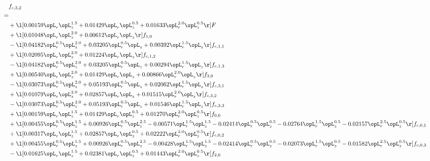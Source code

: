 \begin{alignat}{2} 
\label{eq:f_32_1} 
& f_{c,3,2} \nonumber \\ 
 = \\ 
& + \l[  0.00159 \opL_r \opL_z^{1.5} +  0.01429 \opL_r \opL_z^{0.5} +  0.01633 \opL_r^{2.0} \opL_z^{0.5}  \r] F \nonumber \\ 
& + \l[  0.01048 \opL_r \opL_z^{2.0} +  0.00612 \opL_r \opL_z  \r] f_{1,0} \nonumber \\ 
& - \l[  0.04182 \opL_r^{0.5} \opL_z^{2.0} +  0.03205 \opL_r^{0.5} \opL_z +  0.00392 \opL_r^{1.5} \opL_z  \r] f_{c,1,1} \nonumber \\ 
& + \l[  0.02095 \opL_r \opL_z^{2.0} +  0.01224 \opL_r \opL_z  \r] f_{c,1,2} \nonumber \\ 
& - \l[  0.04182 \opL_r^{0.5} \opL_z^{2.0} +  0.03205 \opL_r^{0.5} \opL_z +  0.00294 \opL_r^{1.5} \opL_z  \r] f_{c,1,3} \nonumber \\ 
& + \l[  0.00540 \opL_r \opL_z^{2.0} +  0.01429 \opL_r \opL_z +  0.00866 \opL_r^{2.0} \opL_z  \r] f_{3,0} \nonumber \\ 
& - \l[  0.03073 \opL_r^{0.5} \opL_z^{2.0} +  0.05193 \opL_r^{0.5} \opL_z +  0.02062 \opL_r^{1.5} \opL_z  \r] f_{c,3,1} \nonumber \\ 
& + \l[  0.01079 \opL_r \opL_z^{2.0} +  0.02857 \opL_r \opL_z +  0.01515 \opL_r^{2.0} \opL_z  \r] f_{c,3,2} \nonumber \\ 
& - \l[  0.03073 \opL_r^{0.5} \opL_z^{2.0} +  0.05193 \opL_r^{0.5} \opL_z +  0.01546 \opL_r^{1.5} \opL_z  \r] f_{c,3,3} \nonumber \\ 
& + \l[  0.00159 \opL_r \opL_z^{1.5} +  0.01429 \opL_r \opL_z^{0.5} +  0.01270 \opL_r^{2.0} \opL_z^{0.5}  \r] f_{0,0} \nonumber \\ 
& + \l[  0.00455 \opL_r^{0.5} \opL_z^{1.5} +  0.00926 \opL_r^{0.5} \opL_z^{2.5}   -0.00571 \opL_r^{1.5} \opL_z^{1.5}   -0.02414 \opL_r^{0.5} \opL_z^{0.5}   -0.02764 \opL_r^{1.5} \opL_z^{0.5}   -0.02157 \opL_r^{2.5} \opL_z^{0.5}  \r] f_{c,0,1} \nonumber \\ 
& + \l[  0.00317 \opL_r \opL_z^{1.5} +  0.02857 \opL_r \opL_z^{0.5} +  0.02222 \opL_r^{2.0} \opL_z^{0.5}  \r] f_{c,0,2} \nonumber \\ 
& + \l[  0.00455 \opL_r^{0.5} \opL_z^{1.5} +  0.00926 \opL_r^{0.5} \opL_z^{2.5}   -0.00428 \opL_r^{1.5} \opL_z^{1.5}   -0.02414 \opL_r^{0.5} \opL_z^{0.5}   -0.02073 \opL_r^{1.5} \opL_z^{0.5}   -0.01582 \opL_r^{2.5} \opL_z^{0.5}  \r] f_{c,0,3} \nonumber \\ 
& - \l[  0.01625 \opL_r \opL_z^{1.5} +  0.02381 \opL_r \opL_z^{0.5} +  0.01443 \opL_r^{2.0} \opL_z^{0.5}  \r] f_{2,0} \nonumber \\ 

\end{alignat}
